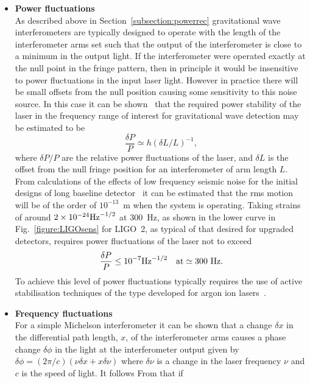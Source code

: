 \documentclass{article}
\begin{document}
\begin{itemize}
\item {\bf Power fluctuations} \\
As described above in Section~\ref{subsection:powerrec} gravitational wave
interferometers are typically designed to operate with the length of the
interferometer arms set such that the output of the interferometer is close to a
minimum in the output light. If the interferometer were operated exactly at the
null point in the fringe pattern, then in principle it would be insensitive to
power fluctuations in the input laser light. However in practice there will be
small offsets from the null position causing some sensitivity to this noise
source.  In this case it can be shown~\cite{Hough} that the required power
stability of the laser in the frequency range of interest for gravitational wave
detection may be estimated to be
%
\begin{equation}
  \frac{\delta P}{P} \simeq h (\delta L/L)^{-1},
  \label{equation:intnoise1}
\end{equation}
%
where $\delta P/P$ are the relative power fluctuations of the laser, and $\delta
L$ is the offset from the null fringe position for an interferometer of arm
length $L$.  From calculations of the effects of low frequency seismic noise for
the initial designs of long baseline detector~\cite{Hough} it can be estimated
that the rms motion will be of the order of $10^{-13}$~m when the system is
operating. Taking strains of around $2 \times 10^{-24}{\rm Hz}^{-1/2}$ at
300~Hz, as shown in the lower curve in Fig.~\ref{figure:LIGOsens} for LIGO~2, as
typical of that desired for upgraded detectors, requires power fluctuations of
the laser not to exceed
%
\begin{equation}
  \frac{\delta P}{P} \leq 10^{-7} {\rm Hz}^{-1/2} \quad {\rm at}
  \simeq 300 {\rm \ Hz}.
  \label{equation:intnoise2}
\end{equation}
%
To achieve this level of power fluctuations typically requires the use of active
stabilisation techniques of the type developed for argon ion
lasers~\cite{Mangan}.
%
\item {\bf Frequency fluctuations} \\
For a simple Michelson interferometer it can be shown that a change $\delta x$
in the differential path length, $x$, of the interferometer arms causes a phase
change $\delta \phi$ in the light at the interferometer output given by $\delta
\phi = (2\pi/c) (\nu \delta x + x \delta\nu)$ where $\delta \nu$ is a change in
the laser frequency $\nu$ and $c$ is the speed of light. It follows From that if

\end{itemize}
\end{document}

